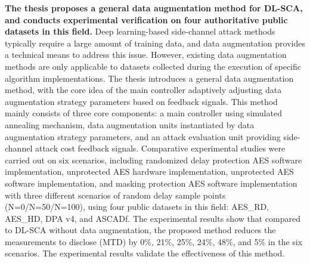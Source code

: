 \textbf{The thesis proposes a general data augmentation method for DL-SCA, and conducts experimental verification on four authoritative public datasets in this field.} Deep learning-based side-channel attack methods typically require a large amount of training data, and data augmentation provides a technical means to address this issue. However, existing data augmentation methods are only applicable to datasets collected during the execution of specific algorithm implementations. The thesis introduces a general data augmentation method, with the core idea of the main controller adaptively adjusting data augmentation strategy parameters based on feedback signals. This method mainly consists of three core components: a main controller using simulated annealing mechanism, data augmentation units instantiated by data augmentation strategy parameters, and an attack evaluation unit providing side-channel attack cost feedback signals. Comparative experimental studies were carried out on six scenarios, including randomized delay protection AES software implementation, unprotected AES hardware implementation, unprotected AES software implementation, and masking protection AES software implementation with three different scenarios of random delay sample points (N=0/N=50/N=100), using four public datasets in this field: AES\_RD, AES\_HD, DPA v4, and ASCADf. The experimental results show that compared to DL-SCA without data augmentation, the proposed method reduces the measurements to disclose (MTD) by 0\%, 21\%, 25\%, 24\%, 48\%, and 5\% in the six scenarios. The experimental results validate the effectiveness of this method.

